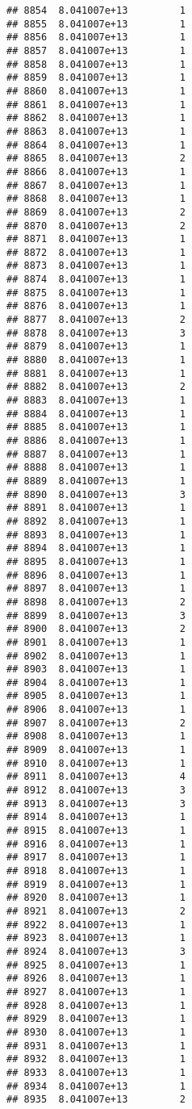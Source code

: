 \documentclass[
]{article}
\begin{document}
\begin{verbatim}
## 8854  8.041007e+13         1
## 8855  8.041007e+13         1
## 8856  8.041007e+13         1
## 8857  8.041007e+13         1
## 8858  8.041007e+13         1
## 8859  8.041007e+13         1
## 8860  8.041007e+13         1
## 8861  8.041007e+13         1
## 8862  8.041007e+13         1
## 8863  8.041007e+13         1
## 8864  8.041007e+13         1
## 8865  8.041007e+13         2
## 8866  8.041007e+13         1
## 8867  8.041007e+13         1
## 8868  8.041007e+13         1
## 8869  8.041007e+13         2
## 8870  8.041007e+13         2
## 8871  8.041007e+13         1
## 8872  8.041007e+13         1
## 8873  8.041007e+13         1
## 8874  8.041007e+13         1
## 8875  8.041007e+13         1
## 8876  8.041007e+13         1
## 8877  8.041007e+13         2
## 8878  8.041007e+13         3
## 8879  8.041007e+13         1
## 8880  8.041007e+13         1
## 8881  8.041007e+13         1
## 8882  8.041007e+13         2
## 8883  8.041007e+13         1
## 8884  8.041007e+13         1
## 8885  8.041007e+13         1
## 8886  8.041007e+13         1
## 8887  8.041007e+13         1
## 8888  8.041007e+13         1
## 8889  8.041007e+13         1
## 8890  8.041007e+13         3
## 8891  8.041007e+13         1
## 8892  8.041007e+13         1
## 8893  8.041007e+13         1
## 8894  8.041007e+13         1
## 8895  8.041007e+13         1
## 8896  8.041007e+13         1
## 8897  8.041007e+13         1
## 8898  8.041007e+13         2
## 8899  8.041007e+13         3
## 8900  8.041007e+13         2
## 8901  8.041007e+13         1
## 8902  8.041007e+13         1
## 8903  8.041007e+13         1
## 8904  8.041007e+13         1
## 8905  8.041007e+13         1
## 8906  8.041007e+13         1
## 8907  8.041007e+13         2
## 8908  8.041007e+13         1
## 8909  8.041007e+13         1
## 8910  8.041007e+13         1
## 8911  8.041007e+13         4
## 8912  8.041007e+13         3
## 8913  8.041007e+13         3
## 8914  8.041007e+13         1
## 8915  8.041007e+13         1
## 8916  8.041007e+13         1
## 8917  8.041007e+13         1
## 8918  8.041007e+13         1
## 8919  8.041007e+13         1
## 8920  8.041007e+13         1
## 8921  8.041007e+13         2
## 8922  8.041007e+13         1
## 8923  8.041007e+13         1
## 8924  8.041007e+13         3
## 8925  8.041007e+13         1
## 8926  8.041007e+13         1
## 8927  8.041007e+13         1
## 8928  8.041007e+13         1
## 8929  8.041007e+13         1
## 8930  8.041007e+13         1
## 8931  8.041007e+13         1
## 8932  8.041007e+13         1
## 8933  8.041007e+13         1
## 8934  8.041007e+13         1
## 8935  8.041007e+13         2

\end{verbatim}
\end{document}

